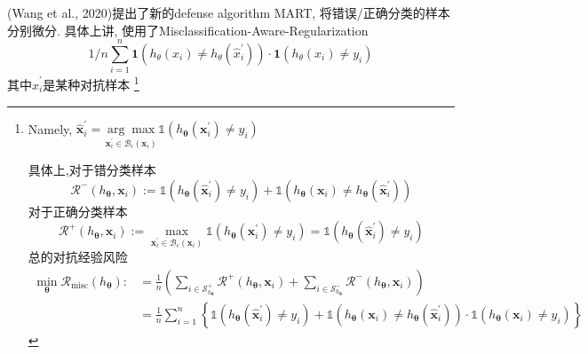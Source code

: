 \documentclass{article}
\begin{document}
(Wang  et  al., 2020)提出了新的defense algorithm MART, 将错误/正确分类的样本分别微分. 具体上讲, 使用了Misclassification-Aware-Regularization 
\begin{equation}
    1 / n \sum_{i=1}^{n} \mathbf{1}\left(h_{\theta}\left(x_{i}\right) \neq h_{\theta}\left(\hat{x}_{i}^{\prime}\right)\right) \cdot \mathbf{1}\left(h_{\theta}\left(x_{i}\right) \neq y_{i}\right)
\end{equation}
其中$\hat{x}_{i}^{\prime}$是某种对抗样本
\footnote{
    Namely,
    $\hat{\mathbf{x}}_{i}^{\prime}=\underset{\mathbf{x}_{i}^{\prime} \in \mathcal{B}_{\epsilon}\left(\mathbf{x}_{i}\right)}{\arg \max } \mathbb{1}\left(h_{\boldsymbol{\theta}}\left(\mathbf{x}_{i}^{\prime}\right) \neq y_{i}\right)$

    具体上,对于错分类样本
    \begin{equation}
        \mathcal{R}^{-}\left(h_{\boldsymbol{\theta}}, \mathbf{x}_{i}\right):=\mathbb{1}\left(h_{\boldsymbol{\theta}}\left(\hat{\mathbf{x}}_{i}^{\prime}\right) \neq y_{i}\right)+\mathbb{1}\left(h_{\boldsymbol{\theta}}\left(\mathbf{x}_{i}\right) \neq h_{\boldsymbol{\theta}}\left(\hat{\mathbf{x}}_{i}^{\prime}\right)\right)
    \end{equation}
    对于正确分类样本
    \begin{equation}
        \mathcal{R}^{+}\left(h_{\boldsymbol{\theta}}, \mathbf{x}_{i}\right):=\max _{\mathbf{x}_{i}^{\prime} \in \mathcal{B}_{\epsilon}\left(\mathbf{x}_{i}\right)} \mathbb{1}\left(h_{\boldsymbol{\theta}}\left(\mathbf{x}_{i}^{\prime}\right) \neq y_{i}\right)=\mathbb{1}\left(h_{\boldsymbol{\theta}}\left(\hat{\mathbf{x}}_{i}^{\prime}\right) \neq y_{i}\right)
    \end{equation}
    总的对抗经验风险
    \begin{equation}
        \begin{aligned}
        \min _{\boldsymbol{\theta}} \mathcal{R}_{\operatorname{misc}}\left(h_{\boldsymbol{\theta}}\right): &=\frac{1}{n}\left(\sum_{i \in \mathcal{S}_{h_{\boldsymbol{\theta}}}^{+}} \mathcal{R}^{+}\left(h_{\boldsymbol{\theta}}, \mathbf{x}_{i}\right)+\sum_{i \in \mathcal{S}_{h_{\boldsymbol{\theta}}}^{-}} \mathcal{R}^{-}\left(h_{\boldsymbol{\theta}}, \mathbf{x}_{i}\right)\right) \\
        &=\frac{1}{n} \sum_{i=1}^{n}\left\{\mathbb{1}\left(h_{\boldsymbol{\theta}}\left(\hat{\mathbf{x}}_{i}^{\prime}\right) \neq y_{i}\right)+\mathbb{1}\left(h_{\boldsymbol{\theta}}\left(\mathbf{x}_{i}\right) \neq h_{\boldsymbol{\theta}}\left(\hat{\mathbf{x}}_{i}^{\prime}\right)\right) \cdot \mathbb{1}\left(h_{\boldsymbol{\theta}}\left(\mathbf{x}_{i}\right) \neq y_{i}\right)\right\}
        \end{aligned}
    \end{equation}

}
\end{document}
